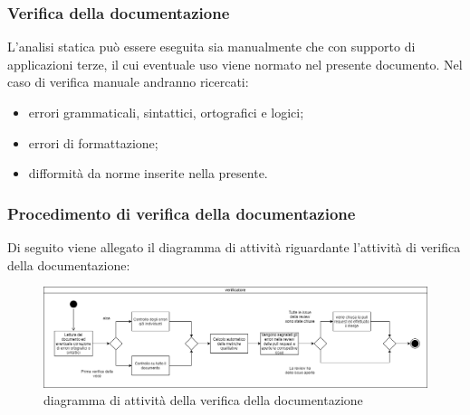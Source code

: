 	\subsubsection{Verifica della documentazione}
	L'analisi statica può essere eseguita sia manualmente che con supporto di applicazioni terze, il cui eventuale uso viene normato nel presente documento. Nel caso di verifica manuale andranno ricercati:
	\begin{itemize}
	    \item errori grammaticali, sintattici, ortografici e logici;
	    \item errori di formattazione;
	    \item difformità da norme inserite nella presente.
	\end{itemize}
		
		\subsubsection{Procedimento di verifica della documentazione}
		Di seguito viene allegato il diagramma di attività riguardante l'attività di verifica della documentazione:
		\begin{figure}[hbt!]
	       \centering \includegraphics[width=1.0\textwidth]{source/images/verifica.png}
	        \caption{diagramma di attività della verifica della documentazione}
	    \end{figure}
	
